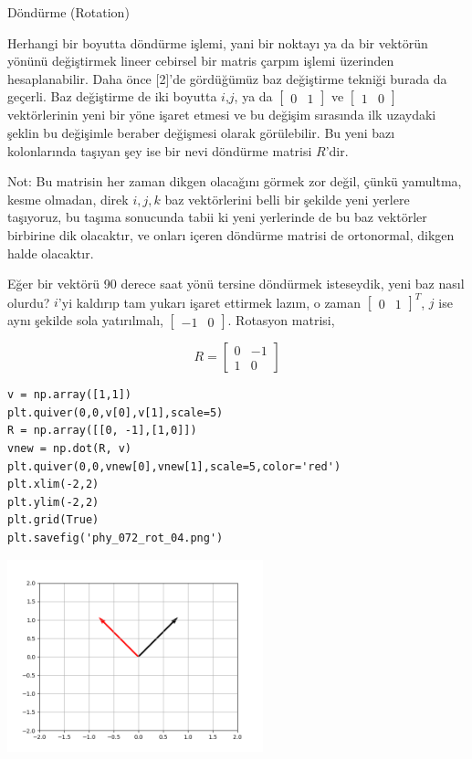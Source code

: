 \documentclass[12pt,fleqn]{article}\usepackage{../../common}
\begin{document}
Döndürme (Rotation)

Herhangi bir boyutta döndürme işlemi, yani bir noktayı ya da bir vektörün yönünü
değiştirmek lineer cebirsel bir matris çarpım işlemi üzerinden hesaplanabilir.
Daha önce [2]'de gördüğümüz baz değiştirme tekniği burada da geçerli. Baz
değiştirme de iki boyutta $i$,$j$, ya da $[\begin{array}{cc} 0 & 1 \end{array}]$
ve $[\begin{array}{cc} 1 & 0 \end{array}]$ vektörlerinin yeni bir yöne işaret
etmesi ve bu değişim sırasında ilk uzaydaki şeklin bu değişimle beraber
değişmesi olarak görülebilir. Bu yeni bazı kolonlarında taşıyan şey ise bir nevi
döndürme matrisi $R$'dir.

Not: Bu matrisin her zaman dikgen olacağını görmek zor değil, çünkü yamultma,
kesme olmadan, direk $i,j,k$ baz vektörlerini belli bir şekilde yeni yerlere
taşıyoruz, bu taşıma sonucunda tabii ki yeni yerlerinde de bu baz vektörler
birbirine dik olacaktır, ve onları içeren döndürme matrisi de ortonormal, dikgen
halde olacaktır.

Eğer bir vektörü 90 derece saat yönü tersine döndürmek isteseydik, yeni baz
nasıl olurdu? $i$'yi kaldırıp tam yukarı işaret ettirmek lazım, o zaman
$[\begin{array}{cc} 0 & 1 \end{array}]^T$, $j$ ise aynı şekilde sola
yatırılmalı, $[\begin{array}{cc} -1 & 0 \end{array}]$. Rotasyon matrisi,

$$
R = \left[\begin{array}{rr}
0 & -1 \\ 1 & 0
\end{array}\right]
$$


\begin{verbatim}
v = np.array([1,1])
plt.quiver(0,0,v[0],v[1],scale=5)
R = np.array([[0, -1],[1,0]])
vnew = np.dot(R, v)
plt.quiver(0,0,vnew[0],vnew[1],scale=5,color='red')
plt.xlim(-2,2)
plt.ylim(-2,2)
plt.grid(True)
plt.savefig('phy_072_rot_04.png')
\end{verbatim}

\includegraphics[width=20em]{phy_072_rot_04.png}
\end{document}
